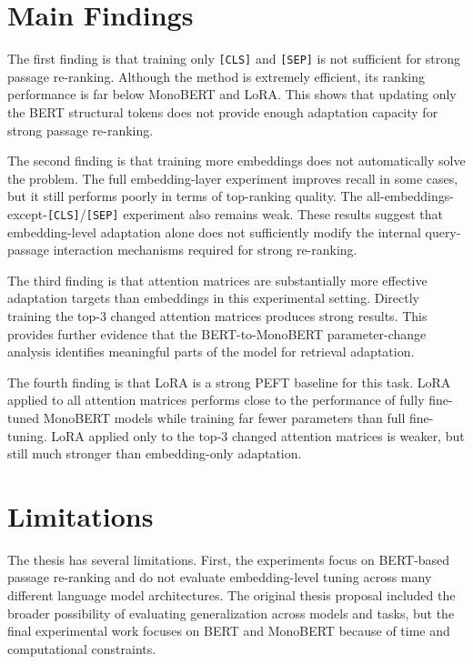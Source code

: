 \section{Main Findings}
\label{sec:conclusions_findings}

The first finding is that training only \texttt{[CLS]} and \texttt{[SEP]} is not sufficient for strong passage re-ranking. Although the method is extremely efficient, its ranking performance is far below MonoBERT and LoRA. This shows that updating only the BERT structural tokens does not provide enough adaptation capacity for strong passage re-ranking.

The second finding is that training more embeddings does not automatically solve the problem. The full embedding-layer experiment improves recall in some cases, but it still performs poorly in terms of top-ranking quality. The all-embeddings-except-\texttt{[CLS]}/\texttt{[SEP]} experiment also remains weak. These results suggest that embedding-level adaptation alone does not sufficiently modify the internal query-passage interaction mechanisms required for strong re-ranking.

The third finding is that attention matrices are substantially more effective adaptation targets than embeddings in this experimental setting. Directly training the top-3 changed attention matrices produces strong results. This provides further evidence that the BERT-to-MonoBERT parameter-change analysis identifies meaningful parts of the model for retrieval adaptation.

The fourth finding is that LoRA is a strong PEFT baseline for this task. LoRA applied to all attention matrices performs close to the performance of fully fine-tuned MonoBERT models while training far fewer parameters than full fine-tuning. LoRA applied only to the top-3 changed attention matrices is weaker, but still much stronger than embedding-only adaptation.

\section{Limitations}
\label{sec:conclusions_limitations}

The thesis has several limitations. First, the experiments focus on BERT-based passage re-ranking and do not evaluate embedding-level tuning across many different language model architectures. The original thesis proposal included the broader possibility of evaluating generalization across models and tasks, but the final experimental work focuses on BERT and MonoBERT because of time and computational constraints.

